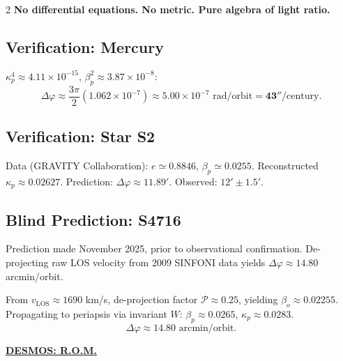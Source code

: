 \documentclass[10pt, a4paper]{article}
\begin{document}
\begin{multicols}{2}
\textbf{No differential equations. No metric. Pure algebra of light ratio.}

\subsection{Verification: Mercury}

$\kappa_p^4 \approx 4.11 \times 10^{-15}$, $\beta_p^2 \approx 3.87 \times 10^{-8}$:
\[
\Delta\varphi \approx \frac{3\pi}{2}(1.062 \times 10^{-7}) \approx 5.00 \times 10^{-7}\text{ rad/orbit} = \mathbf{43''}\text{/century}.
\]

\subsection{Verification: Star S2}

Data (GRAVITY Collaboration): $e \simeq 0.8846$, $\beta_p \simeq 0.0255$. Reconstructed $\kappa_p \approx 0.02627$. Prediction: $\Delta\varphi \approx 11.89'$. Observed: $12' \pm 1.5'$.


\subsection{Blind Prediction: S4716}

\begin{tcolorbox}[colback=blue!5, colframe=black!80!black, title=Blind Prediction Protocol]
Prediction made November 2025, prior to observational confirmation. De-projecting raw LOS velocity from 2009 SINFONI data yields $\Delta\varphi \approx \mathbf{14.80}$ arcmin/orbit.
\end{tcolorbox}

From $v_{\text{LOS}} \approx 1690$ km/s, de-projection factor $\mathcal{P} \approx 0.25$, yielding $\beta_o \approx 0.02255$. Propagating to periapsis via invariant $W$: $\beta_p \approx 0.0265$, $\kappa_p \approx 0.0283$.
\begin{equation}
\boxed{\Delta\varphi \approx 14.80\text{ arcmin/orbit}.}
\end{equation}

\begin{tcolorbox}[colback=gray!5, colframe=black!80!black, title=Desmos Project]
\textbf{\href{https://www.desmos.com/calculator/n4lmkpsebx}{DESMOS: R.O.M.}}
\end{tcolorbox}




\end{multicols}
\end{document}
